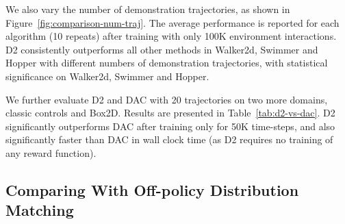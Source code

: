 \documentclass[letterpaper]{article} %
\begin{document}
We also vary the number of demonstration trajectories,
as shown in Figure~\ref{fig:comparison-num-traj}.
The average performance is reported for each algorithm (10 repeats) after training with only 100K environment interactions.
D2 consistently outperforms all other methods in Walker2d, Swimmer and Hopper with different numbers of demonstration trajectories,
with statistical significance on Walker2d, Swimmer and Hopper.

We further evaluate D2 and DAC with 20 trajectories on two more domains, classic controls and Box2D.
Results are presented in Table~\ref{tab:d2-vs-dac}.
D2 significantly outperforms DAC after training only for 50K time-steps, and
also significantly faster than DAC in wall clock time
(as D2 requires no training of any reward function).

\subsection{Comparing With Off-policy Distribution Matching}\label{sec:exp-distribution-matching}
\end{document}
